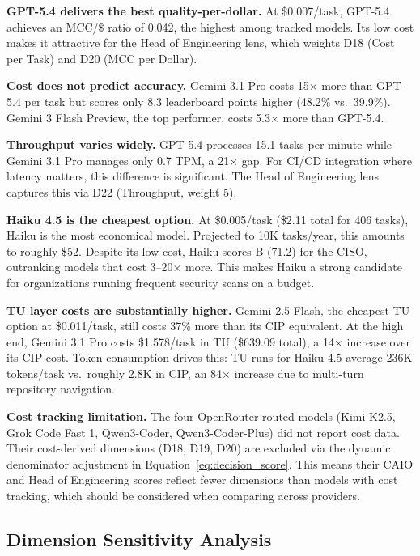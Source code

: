 \documentclass[10pt,twocolumn]{article}
\begin{document}
\textbf{GPT-5.4 delivers the best quality-per-dollar.} At \$0.007/task, GPT-5.4 achieves an MCC/\$ ratio of 0.042, the highest among tracked models. Its low cost makes it attractive for the Head of Engineering lens, which weights D18 (Cost per Task) and D20 (MCC per Dollar).

\textbf{Cost does not predict accuracy.} Gemini 3.1 Pro costs 15$\times$ more than GPT-5.4 per task but scores only 8.3 leaderboard points higher (48.2\% vs.\ 39.9\%). Gemini 3 Flash Preview, the top performer, costs 5.3$\times$ more than GPT-5.4.

\textbf{Throughput varies widely.} GPT-5.4 processes 15.1 tasks per minute while Gemini 3.1 Pro manages only 0.7 TPM, a 21$\times$ gap. For CI/CD integration where latency matters, this difference is significant. The Head of Engineering lens captures this via D22 (Throughput, weight 5).

\textbf{Haiku 4.5 is the cheapest option.} At \$0.005/task (\$2.11 total for 406 tasks), Haiku is the most economical model. Projected to 10K tasks/year, this amounts to roughly \$52. Despite its low cost, Haiku scores B (71.2) for the CISO, outranking models that cost 3--20$\times$ more. This makes Haiku a strong candidate for organizations running frequent security scans on a budget.

\textbf{TU layer costs are substantially higher.} Gemini 2.5 Flash, the cheapest TU option at \$0.011/task, still costs 37\% more than its CIP equivalent. At the high end, Gemini 3.1 Pro costs \$1.578/task in TU (\$639.09 total), a 14$\times$ increase over its CIP cost. Token consumption drives this: TU runs for Haiku 4.5 average 236K tokens/task vs.\ roughly 2.8K in CIP, an 84$\times$ increase due to multi-turn repository navigation.

\textbf{Cost tracking limitation.} The four OpenRouter-routed models (Kimi K2.5, Grok Code Fast 1, Qwen3-Coder, Qwen3-Coder-Plus) did not report cost data. Their cost-derived dimensions (D18, D19, D20) are excluded via the dynamic denominator adjustment in Equation~\ref{eq:decision_score}. This means their CAIO and Head of Engineering scores reflect fewer dimensions than models with cost tracking, which should be considered when comparing across providers.

\subsection{Dimension Sensitivity Analysis}
\label{sec:sensitivity}
\end{document}

